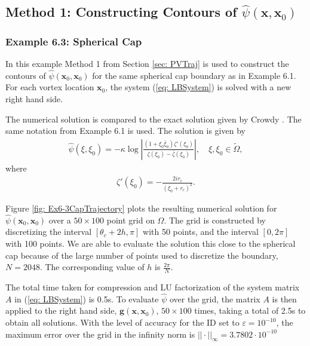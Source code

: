 \documentclass{sfuthesis}
\begin{document}
\subsection{Method 1: Constructing Contours of $\hat{\psi}(\mathbf{x}, \mathbf{x}_0)$}
\subsubsection{Example 6.3: Spherical Cap}
In this example Method 1 from Section \ref{sec: PVTraj}  is used to construct the contours of $\hat{\psi}(\mathbf{x}_0, \mathbf{x}_0)$ for the same spherical cap boundary as in Example 6.1.  
For each vortex location $\mathbf{x}_0$, the system (\ref{eq: LBSystem}) is solved with a new right hand side. 

The numerical solution is compared to the exact solution given by Crowdy \cite{Crowdy2006}. The same notation from Example 6.1 is used. The solution is given by
\begin{align*}
	\hat{\psi}(\xi, \xi_0)=-\kappa \log \left|\frac{(1+\xi_0\bar{\xi}_0)\zeta'(\xi_0)}{\zeta(\xi_0)-\bar{\zeta}(\xi_0)}\right|, \quad \xi, \xi_0 \in \tilde{\Omega},
\end{align*}
where 
\begin{align*}
	\zeta'(\xi_0)=-\frac{2ir_c}{{(\xi_0+r_c)}^2}.
\end{align*}

Figure \ref{fig: Ex6-3CapTrajectory} plots the resulting numerical solution for $\hat{\psi}(\mathbf{x}_0, \mathbf{x}_0)$ over a $50 \times 100$ point grid on $\Omega$. The grid is constructed by discretizing the interval $[\theta_c+2h, \pi]$ with 50 points, and the interval $[0, 2\pi]$ with 100 points. We are able to evaluate the solution this close to the spherical cap because of the large number of points used to discretize the boundary, $N=2048$. The corresponding value of $h$ is $\frac{2\pi}{N}$. 

The total time taken for compression and LU factorization of the system matrix $A$ in (\ref{eq: LBSystem}) is 0.5s. To evaluate $\hat{\psi}$ over the grid, the matrix $A$ is then applied to the right hand side, $\mathbf{g}(\mathbf{x}, \mathbf{x}_0)$, $50 \times 100$ times, taking a total of 2.5s to obtain all solutions. With the level of accuracy for the ID set to $\varepsilon=10^{-10}$, the maximum error over the grid in the infinity norm is ${||\cdot||}_\infty=3.7802\cdot 10^{-10}$
\end{document}
